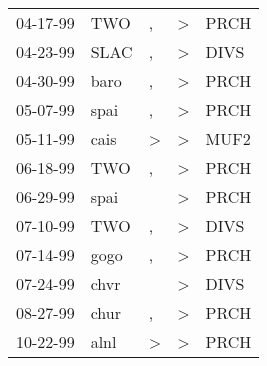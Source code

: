 \begin{supertabular}{p{0.07\textwidth}p{0.06\textwidth}p{0.02\textwidth}p{0.02\textwidth}p{0.06\textwidth}}
 04-17-99\textsuperscript{} &   TWO\textsuperscript{} &             , &  \textgreater &  PRCH\textsuperscript{} \\
 04-23-99\textsuperscript{} &  SLAC\textsuperscript{} &             , &  \textgreater &  DIVS\textsuperscript{} \\
 04-30-99\textsuperscript{} &  baro\textsuperscript{} &             , &  \textgreater &  PRCH\textsuperscript{} \\
 05-07-99\textsuperscript{} &  spai\textsuperscript{} &             , &  \textgreater &  PRCH\textsuperscript{} \\
 05-11-99\textsuperscript{} &  cais\textsuperscript{} &  \textgreater &  \textgreater &  MUF2\textsuperscript{} \\
 06-18-99\textsuperscript{} &   TWO\textsuperscript{} &             , &  \textgreater &  PRCH\textsuperscript{} \\
 06-29-99\textsuperscript{} &  spai\textsuperscript{} &               &  \textgreater &  PRCH\textsuperscript{} \\
 07-10-99\textsuperscript{} &   TWO\textsuperscript{} &             , &  \textgreater &  DIVS\textsuperscript{} \\
 07-14-99\textsuperscript{} &  gogo\textsuperscript{} &             , &  \textgreater &  PRCH\textsuperscript{} \\
 07-24-99\textsuperscript{} &  chvr\textsuperscript{} &               &  \textgreater &  DIVS\textsuperscript{} \\
 08-27-99\textsuperscript{} &  chur\textsuperscript{} &             , &  \textgreater &  PRCH\textsuperscript{} \\
 10-22-99\textsuperscript{} &  alnl\textsuperscript{} &  \textgreater &  \textgreater &  PRCH\textsuperscript{} \\
\end{supertabular}
